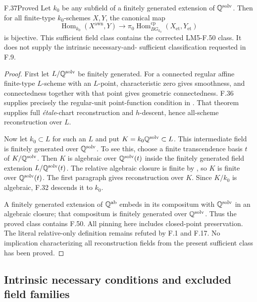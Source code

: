 \begin{claim}{F.37}{Proved}
Let $k_0$ be any subfield of a finitely generated extension of
$\mathbb Q^{\mathrm{solv}}$. Then for all finite-type $k_0$-schemes
$X,Y$, the canonical map
\[
 \operatorname{Hom}_{k_0}(X^{\mathrm{awn}},Y)
 \longrightarrow
 \pi_0\operatorname{Hom}^{\mathrm{cp}}_{BG_{k_0}}
       (X_{\mathrm{et}},Y_{\mathrm{et}})
\]
is bijective. This sufficient field class contains the corrected
LM5-F.50 class. It does not supply the intrinsic necessary-and-
sufficient classification requested in F.9.
\end{claim}
\begin{proof}
First let $L/\mathbb Q^{\mathrm{solv}}$ be finitely generated.
For a connected regular affine finite-type $L$-scheme with an
$L$-point, characteristic zero gives smoothness, and connectedness
together with that point gives geometric connectedness.
F.36 supplies precisely the regular-unit point-function condition
in \citet[Theorem~4.18(5)]{F_CHW2024}. That theorem supplies
full \emph{\'etale}-chart reconstruction and $h$-descent,
hence all-scheme reconstruction over $L$.

Now let $k_0\subset L$ for such an $L$ and put
$K=k_0\mathbb Q^{\mathrm{solv}}\subset L$.
This intermediate field is finitely generated over
$\mathbb Q^{\mathrm{solv}}$. To see this, choose a finite
transcendence basis $t$ of $K/\mathbb Q^{\mathrm{solv}}$.
Then $K$ is algebraic over $\mathbb Q^{\mathrm{solv}}(t)$ inside the
finitely generated field extension $L/\mathbb Q^{\mathrm{solv}}(t)$.
The relative algebraic closure is finite by
\citet[Lemma~9.26.11]{F_StacksFields}, so $K$ is finite over
$\mathbb Q^{\mathrm{solv}}(t)$. The first paragraph gives
reconstruction over $K$. Since $K/k_0$ is algebraic, F.32
descends it to $k_0$.

A finitely generated extension of $\mathbb Q^{\mathrm{ab}}$ embeds
in its compositum with $\mathbb Q^{\mathrm{solv}}$ in an algebraic
closure; that compositum is finitely generated over
$\mathbb Q^{\mathrm{solv}}$. Thus the proved class contains F.50.
All pinning here includes closed-point preservation.
The literal relative-only definition remains refuted by F.1
and F.17. No implication characterizing all reconstruction
fields from the present sufficient class has been proved.
\end{proof}


\subsection{Intrinsic necessary conditions and excluded field families}

